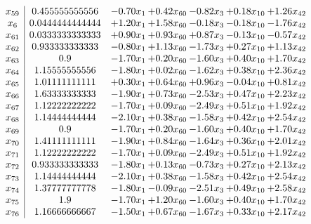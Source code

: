 \documentclass[8pt]{article}
\begin{document}
\[\begin{array}{c| c c@{\hskip 2pt} c@{\hskip 2pt} c@{\hskip 2pt} c@{\hskip 2pt} c@{\hskip 2pt} }
 x_{59}   &  0.455555555556 & -0.70 x_{1} & +  0.42 x_{60} & -0.82 x_{3} & +  0.18 x_{10} & +  1.26 x_{42}\\
 x_{6}   &  0.0444444444444 & +  1.20 x_{1} & +  1.58 x_{60} & -0.18 x_{3} & -0.18 x_{10} & -1.76 x_{42}\\
 x_{61}   &  0.0333333333333 & +  0.90 x_{1} & +  0.93 x_{60} & +  0.87 x_{3} & -0.13 x_{10} & -0.57 x_{42}\\
 x_{62}   &  0.933333333333 & -0.80 x_{1} & +  1.13 x_{60} & -1.73 x_{3} & +  0.27 x_{10} & +  1.13 x_{42}\\
 x_{63}   &  0.9 & -1.70 x_{1} & +  0.20 x_{60} & -1.60 x_{3} & +  0.40 x_{10} & +  1.70 x_{42}\\
 x_{64}   &  1.15555555556 & -1.80 x_{1} & +  0.02 x_{60} & -1.62 x_{3} & +  0.38 x_{10} & +  2.36 x_{42}\\
 x_{65}   &  1.01111111111 & +  0.30 x_{1} & +  0.64 x_{60} & +  0.96 x_{3} & -0.04 x_{10} & +  0.81 x_{42}\\
 x_{66}   &  1.63333333333 & -1.90 x_{1} & +  0.73 x_{60} & -2.53 x_{3} & +  0.47 x_{10} & +  2.23 x_{42}\\
 x_{67}   &  1.12222222222 & -1.70 x_{1} & +  0.09 x_{60} & -2.49 x_{3} & +  0.51 x_{10} & +  1.92 x_{42}\\
 x_{68}   &  1.14444444444 & -2.10 x_{1} & +  0.38 x_{60} & -1.58 x_{3} & +  0.42 x_{10} & +  2.54 x_{42}\\
 x_{69}   &  0.9 & -1.70 x_{1} & +  0.20 x_{60} & -1.60 x_{3} & +  0.40 x_{10} & +  1.70 x_{42}\\
 x_{70}   &  1.41111111111 & -1.90 x_{1} & +  0.84 x_{60} & -1.64 x_{3} & +  0.36 x_{10} & +  2.01 x_{42}\\
 x_{71}   &  1.12222222222 & -1.70 x_{1} & +  0.09 x_{60} & -2.49 x_{3} & +  0.51 x_{10} & +  1.92 x_{42}\\
 x_{72}   &  0.933333333333 & -1.80 x_{1} & +  0.13 x_{60} & -0.73 x_{3} & +  0.27 x_{10} & +  2.13 x_{42}\\
 x_{73}   &  1.14444444444 & -2.10 x_{1} & +  0.38 x_{60} & -1.58 x_{3} & +  0.42 x_{10} & +  2.54 x_{42}\\
 x_{74}   &  1.37777777778 & -1.80 x_{1} & -0.09 x_{60} & -2.51 x_{3} & +  0.49 x_{10} & +  2.58 x_{42}\\
 x_{75}   &  1.9 & -1.70 x_{1} & +  1.20 x_{60} & -1.60 x_{3} & +  0.40 x_{10} & +  1.70 x_{42}\\
 x_{76}   &  1.16666666667 & -1.50 x_{1} & +  0.67 x_{60} & -1.67 x_{3} & +  0.33 x_{10} & +  2.17 x_{42}\\

\end{array}\]
\end{document}

